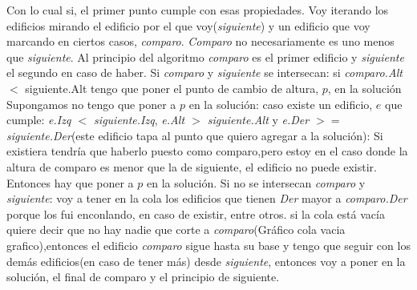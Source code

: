 \documentclass{article}
\begin{document}
Con lo cual si, el primer punto cumple con esas propiedades.
\newline
Voy iterando los edificios mirando el edificio por el que voy(\textit{siguiente}) y un edificio que voy marcando en ciertos casos, \textit{comparo}. \textit{Comparo} no necesariamente es uno menos que \textit{siguiente}.
Al principio del algoritmo \textit{comparo} es el primer edificio y \textit{siguiente} el segundo en caso de haber.
Si \textit{comparo} y \textit{siguiente} se intersecan:\newline
\color{red}{(graficos intersecciones)}\color{black} \newline
si \textit{comparo.Alt} $<$ siguiente.Alt \newline
\color{red}{(grafico A)}\newline \color{black}
                tengo que poner el punto de cambio de altura, $p$, en la solución\newline
                Supongamos no tengo que poner a $p$ en la solución:\newline
                        caso existe un edificio, $e$ que cumple: \textit{e.Izq $<$ siguiente.Izq}, \textit{e.Alt $>$ siguiente.Alt} y \textit{e.Der $>=$ siguiente.Der}(este edificio tapa al punto que quiero agregar a la solución):\newline
\color{red}{(ejemplo grafico C)} \color{black} \newline
                        Si existiera tendría que haberlo puesto como comparo,pero estoy en el caso donde la altura de comparo es menor que la de siguiente, el edificio no puede existir. Entonces hay que poner a $p$ en la solución.\newline
Si no se intersecan \textit{comparo} y \textit{siguiente}:\newline
\color{red}{(grafico no se intersecan)} \color{black} \newline
        voy a tener en la cola los edificios que tienen \textit{Der} mayor a \textit{comparo.Der} porque los fui enconlando, en caso de existir, entre otros.\newline
\color{red}{ (grafico D)} \color{black} \newline
        si la cola está vacía quiere decir que no hay nadie que corte a \textit{comparo}(Gráfico cola vacia grafico),entonces el edificio \textit{comparo} sigue hasta su base y tengo que seguir con los demás edificios(en caso de tener más) desde \textit{siguiente}, entonces voy a poner en la solución, el final de comparo y el principio de siguiente.\newline
\end{document}
